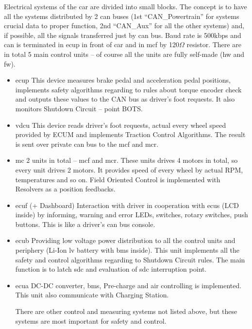 
Electrical systems of the car are divided into small blocks. The concept is to have all the systems distributed by 2 \gls{can} buses (1st “CAN\_Powertrain” for systems crucial data to proper function, 2nd “CAN\_Aux” for all the other systems) and, if possible, all the signals transferred just by \gls{can} bus. Baud rate is 500kbps and \gls{can} is terminated in \gls{ecup} in front of car and in \gls{mcf} by 120$\Omega$ resistor. There are in total 5 main control units – of course all the units are fully self-made (\gls{hw} and \gls{fw}).

\begin{itemize}
\item	\Glsdesc{ecup}
This device measures brake pedal and acceleration pedal positions, implements safety algorithms regarding to rules about torque encoder check and outputs these values to the CAN bus as driver’s foot requests. It also monitors Shutdown Circuit – point BOTS. 

\item	\Glsdesc{vdcu}
This device reads driver’s foot requests, actual every wheel speed provided by ECUM and implements Traction Control Algorithms. The result is sent over private \gls{can} bus to the \gls{mcf} and \gls{mcr}. 

\item	\Glsdesc{mc}
2 units in total – \gls{mcf} and \gls{mcr}. These units drives 4 motors in total, so every unit drives 2 motors. It provides speed of every wheel by actual RPM, temperatures and so on. Field Oriented Control is implemented with Resolvers as a position feedbacks.

\item	\Glsdesc{ecuf} (+ Dashboard)
Interaction with driver in cooperation with \gls{ecus} (LCD inside) by informing, warning and error LEDs, switches, rotary switches, push buttons. This is like a driver’s \gls{can} bus console. 

\item	\Glsdesc{ecub}
Providing low voltage power distribution to all the control units and periphery (Li-Ion \gls{lv} battery with \gls{bms} inside). This unit implements all the safety and control algorithms regarding to Shutdown Circuit rules. The main function is to latch \gls{sdc} and evaluation of \gls{sdc} interruption point. 

\item	\Glsdesc{ecua}
DC-DC converter, \gls{bms}, Pre-charge and \gls{air} controlling is implemented. This unit also communicate with Charging Station.

There are other control and measuring systems not listed above, but these systems are most important for safety and control.

\end{itemize}

